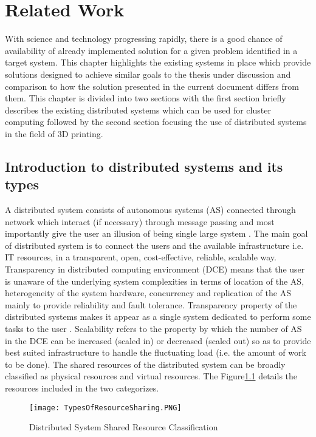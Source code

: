 \chapter{Related Work}

With science and technology progressing rapidly, there is a good chance of availability of already implemented solution for a given problem identified in a target system. This chapter highlights the existing systems in place which provide solutions designed to achieve similar goals to the thesis under discussion and comparison to how the solution presented in the current document differs from them. This chapter is divided into two sections with the first section briefly describes the existing distributed systems which can be used for cluster computing followed by the second section focusing the use of distributed systems in the field of 3D printing.

\section{Introduction to distributed systems and its types}
A distributed system consists of autonomous systems (AS) connected through network which interact (if necessary) through message passing and most importantly give the user an illusion of being single large system \cite{DCE}. The main goal of distributed system is to connect the users and the available infrastructure i.e. IT resources, in a transparent, open, cost-effective, reliable, scalable way. Transparency in distributed computing environment (DCE) means that the user is unaware of the underlying system complexities in terms of location of the AS, heterogeneity of the system hardware, concurrency and replication of the AS mainly to provide reliability and fault tolerance. Transparency property of the distributed systems makes it appear as a single system dedicated to perform some tasks to the user \cite{DSBook}. Scalability refers to the property by which the number of AS in the DCE can be increased (scaled in) or decreased (scaled out) so as to provide best suited infrastructure to handle the fluctuating load (i.e. the amount of work to be done). The shared resources of the distributed system can be broadly classified as physical resources and virtual resources. The Figure\ref{fig:TypesOfResourceSharing} details the resources included in the two categorizes. 

\begin{figure}[ht!]
\centering
\texttt{[image: TypesOfResourceSharing.PNG]}
\caption{Distributed System Shared Resource Classification}
\label{fig:TypesOfResourceSharing}
\end{figure}
  
